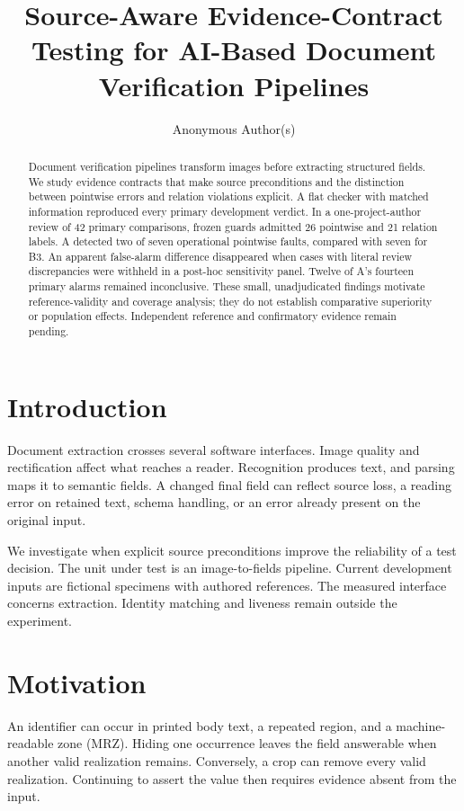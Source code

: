 \documentclass[sigconf,review,anonymous]{acmart}
\title{Source-Aware Evidence-Contract Testing for AI-Based Document Verification Pipelines}
\author{Anonymous Author(s)}
\begin{document}
\begin{abstract}
Document verification pipelines transform images before extracting structured fields. We study evidence contracts that make source preconditions and the distinction between pointwise errors and relation violations explicit. A flat checker with matched information reproduced every primary development verdict. In a one-project-author review of 42 primary comparisons, frozen guards admitted 26 pointwise and 21 relation labels. A detected two of seven operational pointwise faults, compared with seven for B3. An apparent false-alarm difference disappeared when cases with literal review discrepancies were withheld in a post-hoc sensitivity panel. Twelve of A's fourteen primary alarms remained inconclusive. These small, unadjudicated findings motivate reference-validity and coverage analysis; they do not establish comparative superiority or population effects. Independent reference and confirmatory evidence remain pending.
\end{abstract}
\maketitle

\section{Introduction}
Document extraction crosses several software interfaces. Image quality and rectification affect what reaches a reader. Recognition produces text, and parsing maps it to semantic fields. A changed final field can reflect source loss, a reading error on retained text, schema handling, or an error already present on the original input.

We investigate when explicit source preconditions improve the reliability of a test decision. The unit under test is an image-to-fields pipeline. Current development inputs are fictional specimens with authored references. The measured interface concerns extraction. Identity matching and liveness remain outside the experiment.

\section{Motivation}
An identifier can occur in printed body text, a repeated region, and a machine-readable zone (MRZ). Hiding one occurrence leaves the field answerable when another valid realization remains. Conversely, a crop can remove every valid realization. Continuing to assert the value then requires evidence absent from the input.
\end{document}
